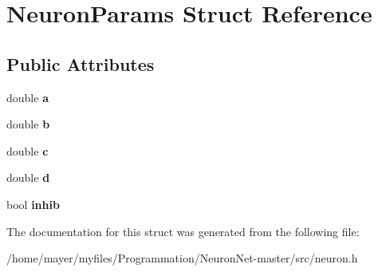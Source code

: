 \hypertarget{structNeuronParams}{}\section{Neuron\+Params Struct Reference}
\label{structNeuronParams}
\subsection*{Public Attributes}
\begin{DoxyCompactItemize}
\item 
\mbox{\label{structNeuronParams_a359703733f5e70bbd67d019e45a3bc85}} 
double {\bfseries a}
\item 
\mbox{\label{structNeuronParams_abd1bd37179d8efa115a8749f9252f77d}} 
double {\bfseries b}
\item 
\mbox{\label{structNeuronParams_a5df2ced2526eb84af2c8d2d34d9bfd93}} 
double {\bfseries c}
\item 
\mbox{\label{structNeuronParams_af2bd3bad3bc5532186cdc8d056a10cfb}} 
double {\bfseries d}
\item 
\mbox{\label{structNeuronParams_a751856d77a821cbd361b774d8653bbe6}} 
bool {\bfseries inhib}
\end{DoxyCompactItemize}


The documentation for this struct was generated from the following file\+:\begin{DoxyCompactItemize}
\item 
/home/mayer/myfiles/\+Programmation/\+Neuron\+Net-\/master/src/neuron.\+h\end{DoxyCompactItemize}
